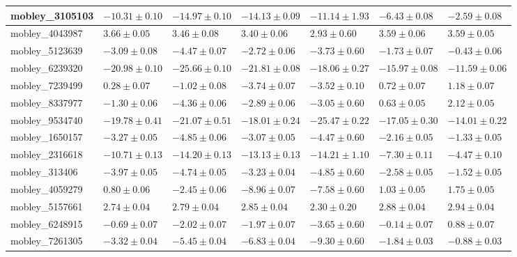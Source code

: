 \documentclass{article}
\begin{document}
\begin{landscape}
\begin{longtable}{|l{3.0cm}|l{3.0cm}|l{3.2cm}|l{3.6cm}|l{3.0cm}|l{3.0cm}|l{3.0cm}|}
mobley\_3105103	&	$	-10.31	\pm	0.10	$	&	$	-14.97	\pm	0.10	$	&	$	-14.13	\pm	0.09	$	&	$	-11.14	\pm	1.93	$	&	$	-6.43	\pm	0.08	$	&	$	-2.59	\pm	0.08	$	\\ \hline
mobley\_4043987	&	$	3.66	\pm	0.05	$	&	$	3.46	\pm	0.08	$	&	$	3.40	\pm	0.06	$	&	$	2.93	\pm	0.60	$	&	$	3.59	\pm	0.06	$	&	$	3.59	\pm	0.05	$	\\ \hline
mobley\_5123639	&	$	-3.09	\pm	0.08	$	&	$	-4.47	\pm	0.07	$	&	$	-2.72	\pm	0.06	$	&	$	-3.73	\pm	0.60	$	&	$	-1.73	\pm	0.07	$	&	$	-0.43	\pm	0.06	$	\\ \hline
mobley\_6239320	&	$	-20.98	\pm	0.10	$	&	$	-25.66	\pm	0.10	$	&	$	-21.81	\pm	0.08	$	&	$	-18.06	\pm	0.27	$	&	$	-15.97	\pm	0.08	$	&	$	-11.59	\pm	0.06	$	\\ \hline
mobley\_7239499	&	$	0.28	\pm	0.07	$	&	$	-1.02	\pm	0.08	$	&	$	-3.74	\pm	0.07	$	&	$	-3.52	\pm	0.10	$	&	$	0.72	\pm	0.07	$	&	$	1.18	\pm	0.07	$	\\ \hline
mobley\_8337977	&	$	-1.30	\pm	0.06	$	&	$	-4.36	\pm	0.06	$	&	$	-2.89	\pm	0.06	$	&	$	-3.05	\pm	0.60	$	&	$	0.63	\pm	0.05	$	&	$	2.12	\pm	0.05	$	\\ \hline
mobley\_9534740	&	$	-19.78	\pm	0.41	$	&	$	-21.07	\pm	0.51	$	&	$	-18.01	\pm	0.24	$	&	$	-25.47	\pm	0.22	$	&	$	-17.05	\pm	0.30	$	&	$	-14.01	\pm	0.22	$	\\ \hline
mobley\_1650157	&	$	-3.27	\pm	0.05	$	&	$	-4.85	\pm	0.06	$	&	$	-3.07	\pm	0.05	$	&	$	-4.47	\pm	0.60	$	&	$	-2.16	\pm	0.05	$	&	$	-1.33	\pm	0.05	$	\\ \hline
mobley\_2316618	&	$	-10.71	\pm	0.13	$	&	$	-14.20	\pm	0.13	$	&	$	-13.13	\pm	0.13	$	&	$	-14.21	\pm	1.10	$	&	$	-7.30	\pm	0.11	$	&	$	-4.47	\pm	0.10	$	\\ \hline
mobley\_313406	&	$	-3.97	\pm	0.05	$	&	$	-4.74	\pm	0.05	$	&	$	-3.23	\pm	0.04	$	&	$	-4.85	\pm	0.60	$	&	$	-2.58	\pm	0.05	$	&	$	-1.52	\pm	0.05	$	\\ \hline
mobley\_4059279	&	$	0.80	\pm	0.06	$	&	$	-2.45	\pm	0.06	$	&	$	-8.96	\pm	0.07	$	&	$	-7.58	\pm	0.60	$	&	$	1.03	\pm	0.05	$	&	$	1.75	\pm	0.05	$	\\ \hline
mobley\_5157661	&	$	2.74	\pm	0.04	$	&	$	2.79	\pm	0.04	$	&	$	2.85	\pm	0.04	$	&	$	2.30	\pm	0.20	$	&	$	2.88	\pm	0.04	$	&	$	2.94	\pm	0.04	$	\\ \hline
mobley\_6248915	&	$	-0.69	\pm	0.07	$	&	$	-2.02	\pm	0.07	$	&	$	-1.97	\pm	0.07	$	&	$	-3.65	\pm	0.60	$	&	$	-0.14	\pm	0.07	$	&	$	0.88	\pm	0.07	$	\\ \hline
mobley\_7261305	&	$	-3.32	\pm	0.04	$	&	$	-5.45	\pm	0.04	$	&	$	-6.83	\pm	0.04	$	&	$	-9.30	\pm	0.60	$	&	$	-1.84	\pm	0.03	$	&	$	-0.88	\pm	0.03	$	\\ \hline

\end{longtable}
\end{landscape}
\end{document}
